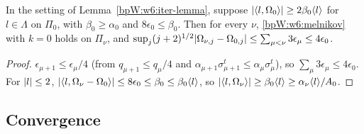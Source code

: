 \begin{lemma}[The conditions with $k=0$]\label{bpW:w6:k0}
In the setting of Lemma~\ref{bpW:w6:iter-lemma}, suppose $\lvert \langle l,\Omega_0\rangle\rvert\ge2\beta_0\langle l\rangle$ for $l\in\Lambda$ on $\Pi_0$,
with $\beta_0\ge\alpha_0$ and $8\epsilon_0\le\beta_0$. Then for every $\nu$, \eqref{bpW:w6:melnikov} with $k=0$ holds on $\Pi_\nu$, and
$\sup_j(j+2)^{1/2}\lvert \Omega_{\nu,j}-\Omega_{0,j}\rvert\le\sum_{\mu<\nu}3\epsilon_\mu\le4\epsilon_0$.
\end{lemma}
\begin{proof}
$\epsilon_{\mu+1}\le\epsilon_\mu/4$ (from $q_{\mu+1}\le q_\mu/4$ and $\alpha_{\mu+1}\sigma_{\mu+1}^t\le\alpha_\mu\sigma_\mu^t$), so
$\sum_\mu3\epsilon_\mu\le4\epsilon_0$. For $\lvert l\rvert\le2$, $\lvert \langle l,\Omega_\nu-\Omega_0\rangle\rvert\le8\epsilon_0\le\beta_0\le\beta_0\langle l\rangle$, so
$\lvert \langle l,\Omega_\nu\rangle\rvert\ge\beta_0\langle l\rangle\ge\alpha_\nu\langle l\rangle/A_0$.
\end{proof}

\subsection{Convergence}\label{bpW:w6:conv-sec}

